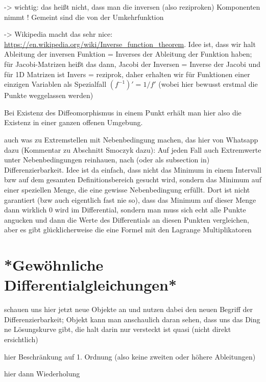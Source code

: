 \documentclass[../H_Analysis_main.tex]{subfiles}
\begin{document}
-> wichtig: das heißt nicht, dass man die inversen (also reziproken) Komponenten nimmt ! Gemeint sind die von der Umkehrfunktion


-> Wikipedia macht das sehr nice: \url{https://en.wikipedia.org/wiki/Inverse_function_theorem}. Idee ist, dass wir halt Ableitung der inversen Funktion = Inverses der Ableitung der Funktion haben; für Jacobi-Matrizen heißt das dann, Jacobi der Inversen = Inverse der Jacobi und für 1D Matrizen ist Invers = reziprok, daher erhalten wir für Funktionen einer einzigen Variablen als Spezialfall $(f^{-1})' = 1/f'$ (wobei hier bewusst erstmal die Punkte weggelassen werden)


\begin{satz}

\end{satz}
Bei Existenz des Diffeomorphismus in einem Punkt erhält man hier also die Existenz in einer ganzen offenen Umgebung.



auch was zu Extremstellen mit Nebenbedingung machen, das hier von Whatsapp dazu (Kommentar zu Abschnitt Smoczyk dazu): Auf jeden Fall auch Extremwerte unter Nebenbedingungen reinhauen, nach (oder als subsection in) Differenzierbarkeit. Idee ist da einfach, dass nicht das Minimum in einem Intervall bzw auf dem gesamten Definitionsbereich gesucht wird, sondern das Minimum auf einer speziellen Menge, die eine gewisse Nebenbedingung erfüllt. Dort ist nicht garantiert (bzw auch eigentlich fast nie so), dass das Minimum auf dieser Menge dann wirklich 0 wird im Differential, sondern man muss sich echt alle Punkte angucken und dann die Werte des Differentials an diesen Punkten vergleichen, aber es gibt glücklicherweise die eine Formel mit den Lagrange Multiplikatoren


\newpage


	\section{*Gewöhnliche Differentialgleichungen*}\label{sec:gdgl}
schauen uns hier jetzt neue Objekte an und nutzen dabei den neuen Begriff der Differenzierbarkeit; Objekt kann man anschaulich daran sehen, dass uns das Ding ne Lösungskurve gibt, die halt darin nur versteckt ist quasi (nicht direkt ersichtlich)

hier Beschränkung auf 1. Ordnung (also keine zweiten oder höhere Ableitungen)

hier dann Wiederholung 
\end{document}
